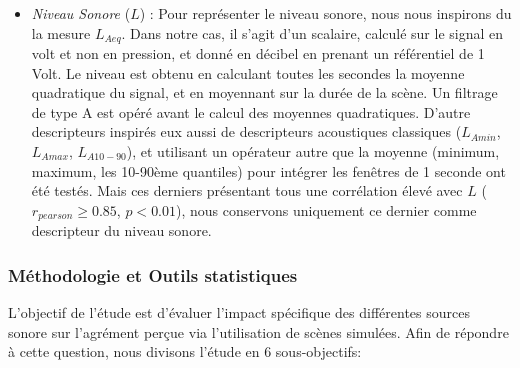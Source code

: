 \begin{itemize}
\begin{itemize}
\item \emph{Niveau Sonore} ($L$) : Pour représenter le niveau sonore, nous nous inspirons du la mesure $L_{Aeq}$. Dans notre cas, il s'agit d'un scalaire, calculé sur le signal en volt et non en pression, et donné en décibel en prenant un référentiel de 1 Volt. Le niveau est obtenu en calculant toutes les secondes la moyenne quadratique du signal, et en moyennant sur la durée de la scène. Un filtrage de type A est opéré avant le calcul des moyennes quadratiques. D'autre descripteurs inspirés eux aussi de descripteurs acoustiques classiques ($L_{Amin}$, $L_{Amax}$, $L_{A10-90}$), et utilisant un opérateur autre que la moyenne (minimum, maximum, les 10-90ème quantiles) pour intégrer les fenêtres de 1 seconde  ont été testés. Mais ces derniers présentant tous une corrélation élevé avec $L$ ($r_{pearson}\geq0.85$, $p<0.01$), nous conservons uniquement ce dernier comme descripteur du niveau sonore.
\end{itemize}
\end{itemize}


\subsubsection{Méthodologie et Outils statistiques}


L'objectif de l'étude est d'évaluer l'impact spécifique des différentes sources sonore sur l'agrément perçue via l'utilisation de scènes simulées. Afin de répondre à cette question, nous divisons l'étude en 6 sous-objectifs:

